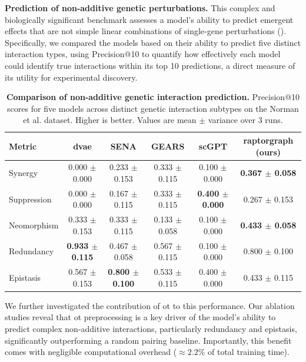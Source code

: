 \documentclass[10pt,letterpaper]{article}
\theoremstyle{definition}
\theoremstyle{remark}
\begin{document}
\textbf{Prediction of non-additive genetic perturbations.} This complex and biologically significant benchmark assesses a model's ability to predict emergent effects that are not simple linear combinations of single-gene perturbations ().
Specifically, we compared the models based on their ability to predict five distinct interaction types, using Precision@10 to quantify how effectively each model could identify true interactions within its top 10 predictions, a direct measure of its utility for experimental discovery.

\begin{table}[!ht]
\centering
\caption{\textbf{Comparison of non-additive genetic interaction prediction.} Precision@10 scores for five models across distinct genetic interaction subtypes on the Norman et al. dataset. Higher is better. Values are mean $\pm$ variance over 3 runs.}
\begin{tabular}{lccccc}
\toprule
Metric & \gls{dvae} & SENA & GEARS & scGPT & \gls{raptorgraph} (ours) \\
\midrule
Synergy & 0.000 $\pm$ 0.000 & 0.233 $\pm$ 0.153 & 0.333 $\pm$ 0.115 & 0.100 $\pm$ 0.000 & \textbf{0.367 $\pm$ 0.058} \\
Suppression & 0.000 $\pm$ 0.000 & 0.167 $\pm$ 0.115 & 0.333 $\pm$ 0.115 & \textbf{0.400 $\pm$ 0.000} & 0.267 $\pm$ 0.153 \\
Neomorphism & 0.333 $\pm$ 0.153 & 0.333 $\pm$ 0.115 & 0.133 $\pm$ 0.058 & 0.100 $\pm$ 0.000 & \textbf{0.433 $\pm$ 0.058} \\
Redundancy & \textbf{0.933 $\pm$ 0.115} & 0.467 $\pm$ 0.058 & 0.567 $\pm$ 0.115 & 0.100 $\pm$ 0.000 & 0.800 $\pm$ 0.100 \\
Epistasis & 0.567 $\pm$ 0.153 & \textbf{0.800 $\pm$ 0.100} & 0.533 $\pm$ 0.115 & 0.400 $\pm$ 0.000 & 0.433 $\pm$ 0.115 \\
\bottomrule
\end{tabular}
\label{tab:gi_scores}
\end{table}

We further investigated the contribution of \gls{ot} to this performance. Our ablation studies reveal that \gls{ot} preprocessing is a key driver of the model's ability to predict complex non-additive interactions, particularly redundancy and epistasis, significantly outperforming a random pairing baseline. Importantly, this benefit comes with negligible computational overhead ($\approx 2.2\%$ of total training time).
\end{document}
